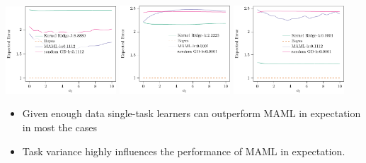 \documentclass[a0paper,portrait]{baposter}
\begin{document}
\begin{poster}
{  \begin{center}
  \includegraphics[width=0.31\textwidth]{nonlin_c_1.pdf}%
  \includegraphics[width=0.31\textwidth]{nonlin_c_2.pdf}%
  \includegraphics[width=0.31\textwidth]{nonlin_c_3.pdf}%
  \end{center}

}

{
  \begin{itemize}
    \color{Pink} \item \color{Black} Given enough data single-task learners can outperform MAML in expectation in most the cases
    \color{Pink} \item \color{Black} Task variance highly influences the performance of MAML in expectation.
  \end{itemize}
}



\end{poster}
\end{document}
